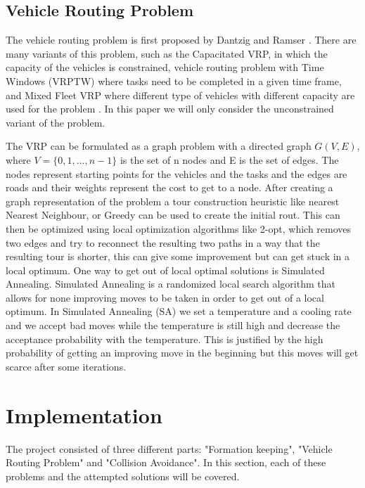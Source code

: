 \documentclass[a4paper,12pt]{article}
\begin{document}
\subsection{Vehicle Routing Problem}
\label{sec:vrp}
The vehicle routing problem is first proposed by Dantzig and Ramser \cite{dantzig1959truck}. There are many variants of this problem, such as the Capacitated VRP, in which the capacity of the vehicles is constrained, vehicle routing problem with Time Windows (VRPTW) where tasks need to be completed in a given time frame, and Mixed Fleet VRP where different type of vehicles with different capacity are used for the problem \cite{golden2008vehicle}. In this paper we will only consider the unconstrained variant of the problem. 

The VRP can be formulated as a graph problem with a directed graph $G(V,E)$, where $V= \{ 0, 1,...,n-1 \}$ is the set of n nodes and E is the set of edges. The nodes represent starting points for the vehicles and the tasks and the edges are roads and their weights represent the cost to get to a node. After creating a graph representation of the problem a tour construction heuristic like nearest Nearest Neighbour, or Greedy can be used to create the initial rout. This can then be optimized using local optimization algorithms like 2-opt, which removes two edges and try to reconnect the resulting two paths in a way that the resulting tour is shorter, this can give some improvement but can get stuck in a local optimum. One way to get out of local optimal solutions is Simulated Annealing\cite{aarts2005simulated}. Simulated Annealing is a randomized local search algorithm that allows for none improving moves to be taken in order to get out of a local optimum. In Simulated Annealing (SA) we set a temperature and a cooling rate and we accept bad moves while the temperature is still high and decrease the acceptance probability with the temperature. This is justified by the high probability of getting an improving move in the beginning but this moves will get scarce after some iterations.   
\section{Implementation}
\label{sec:method}
The project consisted of three different parts: "Formation keeping", "Vehicle Routing Problem" and "Collision Avoidance". In this section, each of these problems and the attempted solutions will be covered.  
\end{document}
